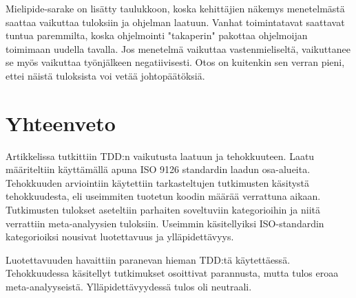 \documentclass[finnish]{tktltiki2}
\theoremstyle{definition}
\theoremstyle{remark}
\begin{document}
Mielipide-sarake on lisätty taulukkoon, koska kehittäjien näkemys menetelmästä saattaa vaikuttaa tuloksiin ja ohjelman laatuun. Vanhat toimintatavat saattavat tuntua paremmilta, koska ohjelmointi "takaperin" pakottaa ohjelmoijan toimimaan uudella tavalla. Jos menetelmä vaikuttaa vastenmieliseltä, vaikuttanee se myös vaikuttaa työnjälkeen negatiivisesti. Otos on kuitenkin sen verran pieni, ettei näistä tuloksista voi vetää johtopäätöksiä. 

\section{Yhteenveto}

Artikkelissa tutkittiin TDD:n vaikutusta laatuun ja tehokkuuteen. Laatu määriteltiin käyttämällä apuna ISO 9126 standardin laadun osa-alueita. Tehokkuuden arviointiin käytettiin tarkasteltujen tutkimusten käsitystä tehokkuudesta, eli useimmiten tuotetun koodin määrää verrattuna aikaan. Tutkimusten tulokset aseteltiin parhaiten soveltuviin kategorioihin ja niitä verrattiin meta-analyysien tuloksiin. Useimmin käsitellyiksi ISO-standardin kategorioiksi nousivat luotettavuus ja ylläpidettävyys.

Luotettavuuden havaittiin paranevan hieman TDD:tä käytettäessä. Tehokkuudessa käsitellyt tutkimukset osoittivat parannusta, mutta tulos eroaa meta-analyyseistä. Ylläpidettävyydessä tulos oli neutraali.



%
%
% 
%







% 
\end{document}
